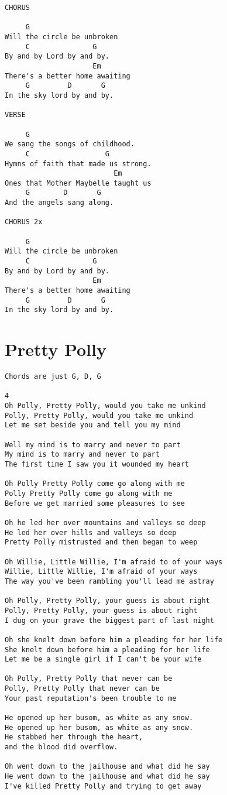 \documentclass[leqno]{memoir}
\begin{document}
\begin{verbatim}
CHORUS

     G
Will the circle be unbroken
     C               G
By and by Lord by and by.
                     Em
There's a better home awaiting
     G         D       G
In the sky lord by and by.

VERSE

     G
We sang the songs of childhood.
     C                  G
Hymns of faith that made us strong.
                          Em
Ones that Mother Maybelle taught us
     G        D       G
And the angels sang along.

CHORUS 2x

     G
Will the circle be unbroken
     C               G
By and by Lord by and by.
                     Em
There's a better home awaiting
     G         D       G
In the sky lord by and by.
\end{verbatim}
\newpage


\chapter{Pretty Polly}
\begin{verbatim}
Chords are just G, D, G

4
Oh Polly, Pretty Polly, would you take me unkind
Polly, Pretty Polly, would you take me unkind
Let me set beside you and tell you my mind

Well my mind is to marry and never to part
My mind is to marry and never to part
The first time I saw you it wounded my heart

Oh Polly Pretty Polly come go along with me
Polly Pretty Polly come go along with me
Before we get married some pleasures to see

Oh he led her over mountains and valleys so deep
He led her over hills and valleys so deep
Pretty Polly mistrusted and then began to weep

Oh Willie, Little Willie, I'm afraid to of your ways
Willie, Little Willie, I'm afraid of your ways
The way you've been rambling you'll lead me astray

Oh Polly, Pretty Polly, your guess is about right
Polly, Pretty Polly, your guess is about right
I dug on your grave the biggest part of last night

Oh she knelt down before him a pleading for her life
She knelt down before him a pleading for her life
Let me be a single girl if I can't be your wife

Oh Polly, Pretty Polly that never can be
Polly, Pretty Polly that never can be
Your past reputation's been trouble to me

He opened up her busom, as white as any snow.
He opened up her busom, as white as any snow.
He stabbed her through the heart,
and the blood did overflow.

Oh went down to the jailhouse and what did he say
He went down to the jailhouse and what did he say
I've killed Pretty Polly and trying to get away
\end{verbatim}
\newpage
\end{document}
